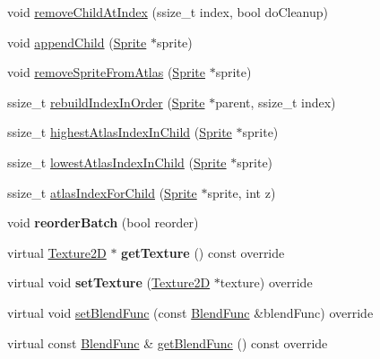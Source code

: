 \begin{DoxyCompactItemize}
\item 
void \hyperlink{classSpriteBatchNode_a3da2c77141f4f02134d2a8f2308879ff}{remove\+Child\+At\+Index} (ssize\+\_\+t index, bool do\+Cleanup)
\item 
void \hyperlink{classSpriteBatchNode_a8da90ef24ba5d4c27b063a302498c436}{append\+Child} (\hyperlink{classSprite}{Sprite} $\ast$sprite)
\item 
void \hyperlink{classSpriteBatchNode_a3e6e600aa1cf10812ae36b2930e56e9d}{remove\+Sprite\+From\+Atlas} (\hyperlink{classSprite}{Sprite} $\ast$sprite)
\item 
ssize\+\_\+t \hyperlink{classSpriteBatchNode_a7de1df383d81f839fb932ad571273766}{rebuild\+Index\+In\+Order} (\hyperlink{classSprite}{Sprite} $\ast$parent, ssize\+\_\+t index)
\item 
ssize\+\_\+t \hyperlink{classSpriteBatchNode_a35d235f36390aea4f98b05f9f883cc76}{highest\+Atlas\+Index\+In\+Child} (\hyperlink{classSprite}{Sprite} $\ast$sprite)
\item 
ssize\+\_\+t \hyperlink{classSpriteBatchNode_aae2f59d34b31c69b731f13296129cf94}{lowest\+Atlas\+Index\+In\+Child} (\hyperlink{classSprite}{Sprite} $\ast$sprite)
\item 
ssize\+\_\+t \hyperlink{classSpriteBatchNode_a86c50a80880095b311ba60fa04c4152f}{atlas\+Index\+For\+Child} (\hyperlink{classSprite}{Sprite} $\ast$sprite, int z)
\item 
\mbox{\label{classSpriteBatchNode_a46297ebf702382d09be8ab76b776613b}} 
void {\bfseries reorder\+Batch} (bool reorder)
\item 
\mbox{\label{classSpriteBatchNode_a81ace6266805316dcec26fe29a7ee97c}} 
virtual \hyperlink{classTexture2D}{Texture2D} $\ast$ {\bfseries get\+Texture} () const override
\item 
\mbox{\label{classSpriteBatchNode_aacd24d3804cf12144c34999d8aa115bb}} 
virtual void {\bfseries set\+Texture} (\hyperlink{classTexture2D}{Texture2D} $\ast$texture) override
\item 
virtual void \hyperlink{classSpriteBatchNode_a6cf0c9ae034ec3418a019846b1d93efc}{set\+Blend\+Func} (const \hyperlink{structBlendFunc}{Blend\+Func} \&blend\+Func) override
\item 
virtual const \hyperlink{structBlendFunc}{Blend\+Func} \& \hyperlink{classSpriteBatchNode_a06bd31ad6fda00cf601229736c2cf2ca}{get\+Blend\+Func} () const override

\end{DoxyCompactItemize}
